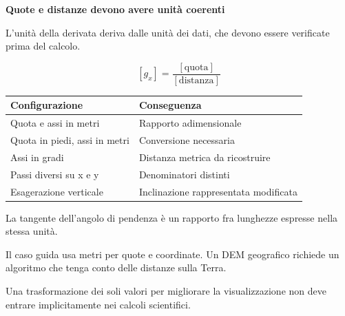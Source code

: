 \documentclass[12pt,aspectratio=1610]{beamer}
\newcommand{\PBody}[1]{\par{\fontsize{11.3}{14.8}\selectfont #1\par}}
\newcommand{\PSmall}[1]{\par{\fontsize{9.8}{13.1}\selectfont #1\par}}
\newcommand{\PInfo}[1]{%
\begin{tcolorbox}[enhanced,arc=1.6mm,boxrule=.55pt,colback=GeoTint,
 colframe=Rule!80!Classical,left=2.3mm,right=2.3mm,top=2mm,bottom=2mm,
 before skip=1mm,after skip=1mm]
\PSmall{#1}\end{tcolorbox}}
\begin{document}
\begin{frame}[plain]\hypertarget{slide52}{}
\begin{lrbox}{\TitleBox}
\begin{minipage}[t]{17.7cm}\raggedright\color{Ink}\fontsize{11.3}{14.8}\selectfont
\color{Navy}\bfseries\fontsize{20.6}{24.5}\selectfont Quote e distanze devono avere unità coerenti
\end{minipage}\end{lrbox}

\begin{lrbox}{\RecallBox}
\begin{minipage}[t]{14.3cm}\raggedright\color{Ink}\fontsize{11.3}{14.8}\selectfont
\fontsize{10.3}{13.8}\selectfont L’unità della derivata deriva dalle unità dei dati, che devono essere verificate prima del calcolo.
\end{minipage}\end{lrbox}

\begin{lrbox}{\PilotLeftBox}
\begin{minipage}[t]{10.05cm}\raggedright\color{Ink}\fontsize{11.3}{14.8}\selectfont
\[[g_x]=\frac{[\mathrm{quota}]}{[\mathrm{distanza}]}\]
{\fontsize{10.2}{13.1}\selectfont\renewcommand{\arraystretch}{1.45}\begin{tabular}{@{}p{4.2cm}p{4.8cm}@{}}\toprule
\textbf{Configurazione} & \textbf{Conseguenza}\\\midrule
Quota e assi in metri & Rapporto adimensionale\\
Quota in piedi, assi in metri & Conversione necessaria\\
Assi in gradi & Distanza metrica da ricostruire\\
Passi diversi su x e y & Denominatori distinti\\
Esagerazione verticale & Inclinazione rappresentata modificata\\
\bottomrule\end{tabular}}

\end{minipage}\end{lrbox}

\begin{lrbox}{\PilotRightBox}
\begin{minipage}[t]{7.55cm}\raggedright\color{Ink}\fontsize{11.3}{14.8}\selectfont
\PBody{La tangente dell’angolo di pendenza è un rapporto fra lunghezze espresse nella stessa unità.}
\vspace{2.5mm}
\PInfo{Il caso guida usa metri per quote e coordinate. Un DEM geografico richiede un algoritmo che tenga conto delle distanze sulla Terra.}
\PBody{Una trasformazione dei soli valori per migliorare la visualizzazione non deve entrare implicitamente nei calcoli scientifici.}
\vspace{2.5mm}


\end{minipage}
\end{lrbox}
\end{frame}
\end{document}
